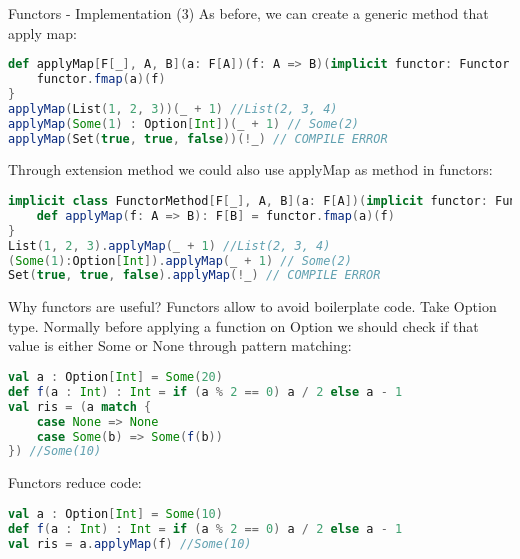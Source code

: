 \begin{frame}[fragile]{Functors - Implementation (3)}			
	As before, we can create a generic method that apply map:
\begin{lstlisting}[language=scala]
def applyMap[F[_], A, B](a: F[A])(f: A => B)(implicit functor: Functor[F]): F[B] = {
	functor.fmap(a)(f)
}
applyMap(List(1, 2, 3))(_ + 1) //List(2, 3, 4)
applyMap(Some(1) : Option[Int])(_ + 1) // Some(2)
applyMap(Set(true, true, false))(!_) // COMPILE ERROR
\end{lstlisting}	
	Through extension method we could also use applyMap as method in functors:
\begin{lstlisting}[language=scala]
implicit class FunctorMethod[F[_], A, B](a: F[A])(implicit functor: Functor[F]) {
	def applyMap(f: A => B): F[B] = functor.fmap(a)(f)
}
List(1, 2, 3).applyMap(_ + 1) //List(2, 3, 4)
(Some(1):Option[Int]).applyMap(_ + 1) // Some(2)
Set(true, true, false).applyMap(!_) // COMPILE ERROR
\end{lstlisting}	
\end{frame}

\begin{frame}[fragile]{Why functors are useful?}
	Functors allow to avoid boilerplate code.
	Take Option type. 
	Normally before applying a function on Option we should check if that value is either Some or None through pattern matching:
\begin{lstlisting}[language=scala]
val a : Option[Int] = Some(20)
def f(a : Int) : Int = if (a % 2 == 0) a / 2 else a - 1
val ris = (a match {
	case None => None
	case Some(b) => Some(f(b))
}) //Some(10)
\end{lstlisting}	
	
	Functors reduce code:
\begin{lstlisting}[language=scala]
val a : Option[Int] = Some(10)
def f(a : Int) : Int = if (a % 2 == 0) a / 2 else a - 1
val ris = a.applyMap(f) //Some(10)
\end{lstlisting}
\end{frame}